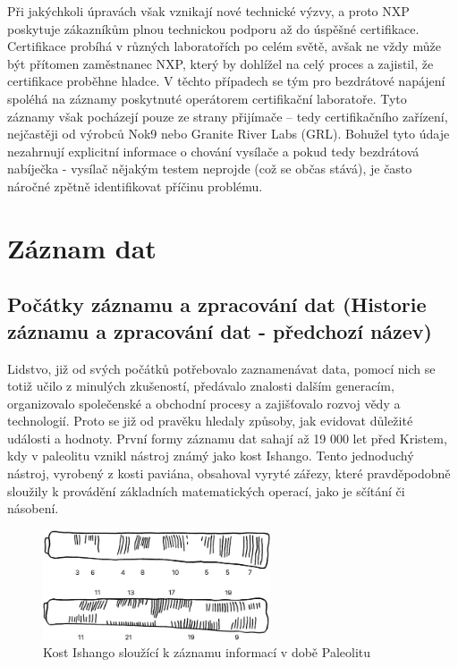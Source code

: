 Při jakýchkoli úpravách však vznikají nové technické výzvy, a proto NXP poskytuje zákazníkům plnou technickou podporu až do úspěšné certifikace. Certifikace 
probíhá v různých laboratořích po celém světě, avšak ne vždy může být přítomen zaměstnanec NXP, který by dohlížel na celý proces a zajistil, že certifikace 
proběhne hladce. V těchto případech se tým pro bezdrátové napájení spoléhá na záznamy poskytnuté operátorem certifikační laboratoře. Tyto záznamy však 
pocházejí pouze ze strany přijímače – tedy certifikačního zařízení, nejčastěji od výrobců Nok9 nebo Granite River Labs (GRL). Bohužel tyto údaje nezahrnují 
explicitní informace o chování vysílače a pokud tedy bezdrátová nabíječka - vysílač nějakým testem neprojde (což se občas stává), je často náročné zpětně 
identifikovat příčinu problému. \cite{nxp_wireless_charging_team}


\chapter{Záznam dat}
\label{zaznam_dat}

\section{Počátky záznamu a zpracování dat (Historie záznamu a zpracování dat - předchozí název)}
\label{historie}
Lidstvo, již od svých počátků potřebovalo zaznamenávat data, pomocí nich se totiž učilo z minulých zkušeností, předávalo znalosti dalším generacím, 
organizovalo společenské a obchodní procesy a zajišťovalo rozvoj vědy a technologií. Proto se již od pravěku hledaly způsoby, jak evidovat důležité 
události a hodnoty. První formy záznamu dat sahají až 19 000 let před Kristem, kdy v paleolitu vznikl nástroj známý jako kost Ishango. Tento jednoduchý 
nástroj, vyrobený z kosti paviána, obsahoval vyryté zářezy, které pravděpodobně sloužily k provádění základních matematických operací, jako je sčítání či 
násobení.

\begin{figure}[h] %
    \centering
    \includegraphics[width=0.6\textwidth]{obrazky-figures/ishango.jpg}
    \caption{Kost Ishango sloužící k záznamu informací v době Paleolitu \cite{ishango_picture}}
    \label{fig:ishango}
\end{figure}

